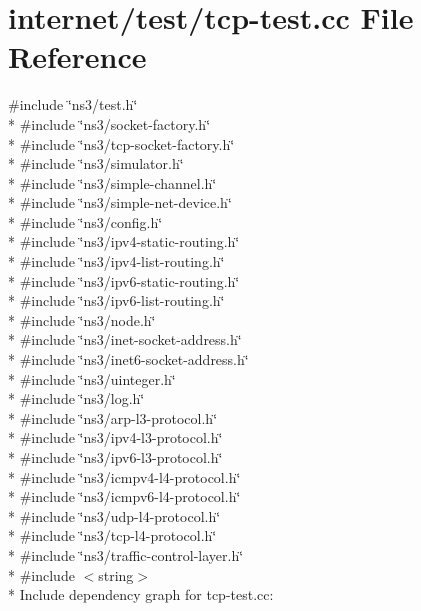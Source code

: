 \hypertarget{tcp-test_8cc}{}\section{internet/test/tcp-\/test.cc File Reference}
\label{tcp-test_8cc}
{\ttfamily \#include \char`\"{}ns3/test.\+h\char`\"{}}\\*
{\ttfamily \#include \char`\"{}ns3/socket-\/factory.\+h\char`\"{}}\\*
{\ttfamily \#include \char`\"{}ns3/tcp-\/socket-\/factory.\+h\char`\"{}}\\*
{\ttfamily \#include \char`\"{}ns3/simulator.\+h\char`\"{}}\\*
{\ttfamily \#include \char`\"{}ns3/simple-\/channel.\+h\char`\"{}}\\*
{\ttfamily \#include \char`\"{}ns3/simple-\/net-\/device.\+h\char`\"{}}\\*
{\ttfamily \#include \char`\"{}ns3/config.\+h\char`\"{}}\\*
{\ttfamily \#include \char`\"{}ns3/ipv4-\/static-\/routing.\+h\char`\"{}}\\*
{\ttfamily \#include \char`\"{}ns3/ipv4-\/list-\/routing.\+h\char`\"{}}\\*
{\ttfamily \#include \char`\"{}ns3/ipv6-\/static-\/routing.\+h\char`\"{}}\\*
{\ttfamily \#include \char`\"{}ns3/ipv6-\/list-\/routing.\+h\char`\"{}}\\*
{\ttfamily \#include \char`\"{}ns3/node.\+h\char`\"{}}\\*
{\ttfamily \#include \char`\"{}ns3/inet-\/socket-\/address.\+h\char`\"{}}\\*
{\ttfamily \#include \char`\"{}ns3/inet6-\/socket-\/address.\+h\char`\"{}}\\*
{\ttfamily \#include \char`\"{}ns3/uinteger.\+h\char`\"{}}\\*
{\ttfamily \#include \char`\"{}ns3/log.\+h\char`\"{}}\\*
{\ttfamily \#include \char`\"{}ns3/arp-\/l3-\/protocol.\+h\char`\"{}}\\*
{\ttfamily \#include \char`\"{}ns3/ipv4-\/l3-\/protocol.\+h\char`\"{}}\\*
{\ttfamily \#include \char`\"{}ns3/ipv6-\/l3-\/protocol.\+h\char`\"{}}\\*
{\ttfamily \#include \char`\"{}ns3/icmpv4-\/l4-\/protocol.\+h\char`\"{}}\\*
{\ttfamily \#include \char`\"{}ns3/icmpv6-\/l4-\/protocol.\+h\char`\"{}}\\*
{\ttfamily \#include \char`\"{}ns3/udp-\/l4-\/protocol.\+h\char`\"{}}\\*
{\ttfamily \#include \char`\"{}ns3/tcp-\/l4-\/protocol.\+h\char`\"{}}\\*
{\ttfamily \#include \char`\"{}ns3/traffic-\/control-\/layer.\+h\char`\"{}}\\*
{\ttfamily \#include $<$string$>$}\\*
Include dependency graph for tcp-\/test.cc\+:
